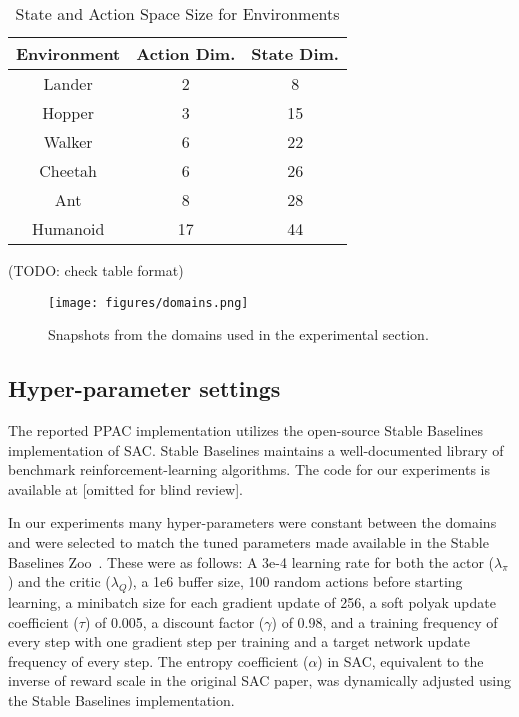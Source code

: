 \documentclass{article}
\begin{document}
            \begin{center}
                \begin{table}
                    \centering
                    \caption{State and Action Space Size for Environments}
                    \begin{tabular}{ | c c c | }
                        \hline
                        Environment & Action Dim. & State Dim. \\
                        \hline
                        Lander & 2 & 8 \\ 
                        Hopper & 3 & 15 \\  
                        Walker & 6 & 22 \\    
                        Cheetah & 6 & 26 \\  
                        Ant & 8 & 28 \\  
                        Humanoid & 17 & 44 \\
                        \hline
                    \end{tabular}
                    \label{table:state-action-dim}
                \end{table}
            \end{center}
            
            (TODO: check table format)


            \begin{figure}
                \texttt{[image: figures/domains.png]}
                \caption{Snapshots from the domains used in the experimental section.}
                \label{domains}
            \end{figure}

        \subsection{Hyper-parameter settings}

            The reported PPAC implementation utilizes the open-source Stable Baselines~\cite{stable-baselines} implementation of SAC. Stable Baselines maintains a well-documented library of benchmark reinforcement-learning algorithms. The code for our experiments is available at [omitted for blind review].

            In our experiments many hyper-parameters were constant between the domains and were selected to match the tuned parameters made available in the Stable Baselines Zoo~\cite{rl-zoo3}. These were as follows: A 3e-4 learning rate for both the actor ($\lambda_\pi$) and the critic ($\lambda_Q$), a 1e6 buffer size, 100 random actions before starting learning, a minibatch size for each gradient update of 256, a soft polyak update coefficient ($\tau$) of 0.005, a discount factor ($\gamma$) of 0.98, and a training frequency of every step with one gradient step per training and a target network update frequency of every step.
            The entropy coefficient ($\alpha$) in SAC, equivalent to the inverse of reward scale in the original SAC paper, was dynamically adjusted using the Stable Baselines implementation.
\end{document}
